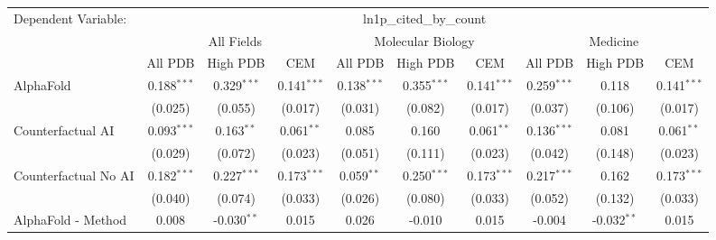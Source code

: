 \begingroup
\centering
\begin{tabular}{lccccccccc}
   \tabularnewline \midrule \midrule
   Dependent Variable: & \multicolumn{9}{c}{ln1p\_cited\_by\_count}\\
 & \multicolumn{3}{c}{All Fields} & \multicolumn{3}{c}{Molecular Biology} & \multicolumn{3}{c}{Medicine} \\
\cmidrule(lr){2-7} \cmidrule(lr){5-10} \cmidrule(lr){8-7}
 & \multicolumn{1}{c}{All PDB} & \multicolumn{1}{c}{High PDB} & \multicolumn{1}{c}{CEM} & \multicolumn{1}{c}{All PDB} & \multicolumn{1}{c}{High PDB} & \multicolumn{1}{c}{CEM} & \multicolumn{1}{c}{All PDB} & \multicolumn{1}{c}{High PDB} & \multicolumn{1}{c}{CEM} \\
\cmidrule(lr){2-3} \cmidrule(lr){3-4} \cmidrule(lr){4-5} \cmidrule(lr){5-6} \cmidrule(lr){6-7} \cmidrule(lr){7-8} \cmidrule(lr){8-9} \cmidrule(lr){9-10} \cmidrule(lr){10-3}
   AlphaFold                                                   & 0.188$^{***}$ & 0.329$^{***}$ & 0.141$^{***}$ & 0.138$^{***}$ & 0.355$^{***}$  & 0.141$^{***}$ & 0.259$^{***}$ & 0.118          & 0.141$^{***}$\\   
                                                               & (0.025)       & (0.055)       & (0.017)       & (0.031)       & (0.082)        & (0.017)       & (0.037)       & (0.106)        & (0.017)\\   
   Counterfactual AI                                           & 0.093$^{***}$ & 0.163$^{**}$  & 0.061$^{**}$  & 0.085         & 0.160          & 0.061$^{**}$  & 0.136$^{***}$ & 0.081          & 0.061$^{**}$\\   
                                                               & (0.029)       & (0.072)       & (0.023)       & (0.051)       & (0.111)        & (0.023)       & (0.042)       & (0.148)        & (0.023)\\   
   Counterfactual No AI                                        & 0.182$^{***}$ & 0.227$^{***}$ & 0.173$^{***}$ & 0.059$^{**}$  & 0.250$^{***}$  & 0.173$^{***}$ & 0.217$^{***}$ & 0.162          & 0.173$^{***}$\\   
                                                               & (0.040)       & (0.074)       & (0.033)       & (0.026)       & (0.080)        & (0.033)       & (0.052)       & (0.132)        & (0.033)\\   
   AlphaFold - Method                                          & 0.008         & -0.030$^{**}$ & 0.015         & 0.026         & -0.010         & 0.015         & -0.004        & -0.032$^{**}$  & 0.015\\   

\end{tabular}
